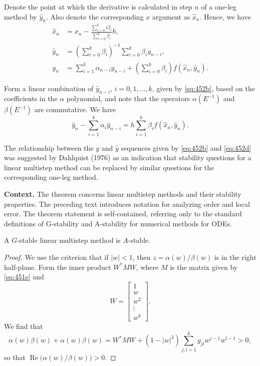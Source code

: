 \begin{theorem}
\begin{definition}[G-stable (451A)]
Denote the point at which the derivative is calculated in step $n$ of a one-leg method by $\widehat{y}_{n}$. Also denote the corresponding $x$ argument as $\widehat{x}_{n}$. Hence, we have
\begin{align}
\widehat{x}_{n} &= x_{n} - \frac{\sum_{i=0}^{k} i\beta_{i}}{\sum_{i=0}^{k} \beta_{i}} h, \label{eq:452a} \\
\widehat{y}_{n} &= \left( \sum_{i=0}^{k} \beta_{i} \right)^{-1} \sum_{i=0}^{k} \beta_{i} y_{n-i}, \label{eq:452b} \\
y_{n} &= \sum_{i=1}^{k} \alpha_{n-i} y_{n-i} + \left( \sum_{i=0}^{k} \beta_{i} \right) f(\widehat{x}_{n}, \widehat{y}_{n}). \label{eq:452c}
\end{align}

Form a linear combination of $\widehat{y}_{n-i}$, $i = 0, 1, \dots, k$, given by \eqref{eq:452b}, based on the coefficients in the $\alpha$ polynomial, and note that the operators $\alpha(E^{-1})$ and $\beta(E^{-1})$ are commutative. We have
\[
\widehat{y}_{n} - \sum_{i=1}^{k} \alpha_{i} \widehat{y}_{n-i} = h \sum_{i=1}^{k} \beta_{i} f(\widehat{x}_{n}, \widehat{y}_{n}). \label{eq:452d}
\]

The relationship between the $y$ and $\widehat{y}$ sequences given by \eqref{eq:452b} and \eqref{eq:452d} was suggested by Dahlquist (1976) as an indication that stability questions for a linear multistep method can be replaced by similar questions for the corresponding one-leg method.
\end{definition}

\noindent\textbf{Context.}
The theorem concerns linear multistep methods and their stability properties. The preceding text introduces notation for analyzing order and local error. The theorem statement is self-contained, referring only to the standard definitions of G-stability and A-stability for numerical methods for ODEs.

\begin{theorem}

  \label{thm:454A}
A $G$-stable linear multistep method is $A$-stable.
\end{theorem}

\begin{proof}
We use the criterion that if $|w| < 1$, then $z = \alpha(w)/\beta(w)$ is in the right half-plane. Form the inner product $W^* M W$, where $M$ is the matrix given by \eqref{eq:451e} and
\[
W = \begin{bmatrix}
1 \\
w \\
w^2 \\
\vdots \\
w^k
\end{bmatrix}.
\]
We find that
\[
\alpha(w)\overline{\beta(w)} + \overline{\alpha(w)}\beta(w) = W^* M W + (1 - |w|^2) \sum_{j,l=1}^k g_{jl} w^{j-1} \overline{w}^{l-1} > 0,
\]
so that $\operatorname{Re}\bigl( \alpha(w)/\beta(w) \bigr) > 0$.
\end{proof}


\end{theorem}
